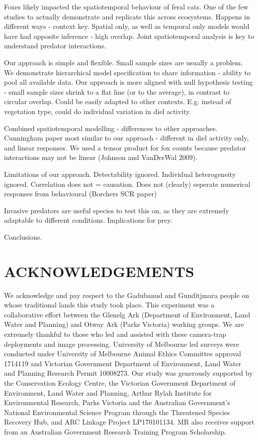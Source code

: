 \documentclass[]{elsarticle} %
\begin{document}
Foxes likely impacted the spatiotemporal behaviour of feral cats. One of the few studies to actually demonstrate and replicate this across ecosystems.
Happens in different ways - context key. Spatial only, as well as temporal only models would have had opposite inference - high overlap. Joint spatiotemporal analysis is key to understand predator interactions.

Our approach is simple and flexible.
Small sample sizes are usually a problem. We demonstrate hierarchical model specification to share information - ability to pool all available data.
Our approach is more aligned with null hypothesis testing - small sample sizes shrink to a flat line (or to the average), in contrast to circular overlap.
Could be easily adapted to other contexts. E.g. instead of vegetation type, could do individual variation in diel activity.

Combined spatiotemporal modelling - differences to other approaches.
Cunningham paper most similar to our approach - different in diel activity only, and linear responses.
We used a tensor product for fox counts because predator interactions may not be linear (Johnson and VanDerWal 2009).

Limitations of our approach.
Detectability ignored.
Individual heterogeneity ignored.
Correlation does not = causation.
Does not (clearly) seperate numerical responses from behavioural (Borchers SCR paper)

Invasive predators are useful species to test this on, as they are extremely adaptable to different conditions.
Implications for prey.

Conclusions.

\newpage

\hypertarget{acknowledgements}{%
\section{ACKNOWLEDGEMENTS}\label{acknowledgements}}

We acknowledge and pay respect to the Gadubanud and Gunditjmara people on whose traditional lands this study took place. This experiment was a collaborative effort between the Glenelg Ark (Department of Environment, Land Water and Planning) and Otway Ark (Parks Victoria) working groups. We are extremely thankful to those who led and assisted with these camera-trap deployments and image processing. University of Melbourne led surveys were conducted under University of Melbourne Animal Ethics Committee approval 1714119 and Victorian Government Department of Environment, Land Water and Planning Research Permit 10008273. Our study was generously supported by the Conservation Ecology Centre, the Victorian Government Department of Environment, Land Water and Planning, Arthur Rylah Institute for Environmental Research, Parks Victoria and the Australian Government's National Environmental Science Program through the Threatened Species Recovery Hub, and ARC Linkage Project LP170101134. MR also receives support from an Australian Government Research Training Program Scholarship.
\end{document}

